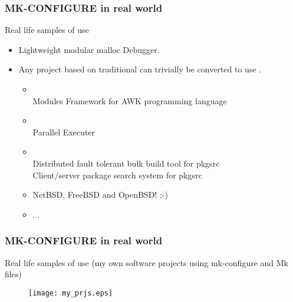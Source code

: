 \documentclass[hyperref={colorlinks=true}]{beamer}
\begin{document}
\begin{frame}[fragile,t]
  \frametitle{MK-CONFIGURE in real world}
  \begin{block}{Real life samples of use}
  \begin{itemize}
  \item Lightweight modular malloc Debugger.\\
  \item Any project based on traditional
     can trivially be converted
    to use .
    \begin{itemize}
    \item {}\\
      Modules Framework for AWK programming language
    \item {}\\
      Parallel Executer
    \item {}\\
      Distributed fault tolerant bulk build tool for pkgsrc
      \\
      Client/server package search system for pkgsrc
    \item NetBSD, FreeBSD and OpenBSD! ;-)
    \item ...
    \end{itemize}
  \end{itemize}
  \end{block}
\end{frame}


\begin{frame}[fragile,t]
  \frametitle{MK-CONFIGURE in real world}
  \begin{block}{Real life samples of use (my own software projects using
      mk-configure and Mk files)}
    \begin{figure}
      \texttt{[image: my\_prjs.eps]}
    \end{figure}
  \end{block}
\end{frame}

\end{document}

